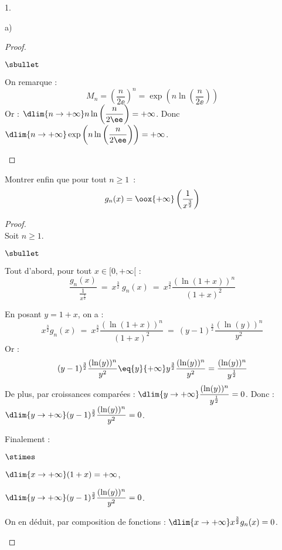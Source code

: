 \documentclass[11pt]{article}%
\begin{document}
\begin{noliste}{1.}
\begin{noliste}{a)}
\begin{proof}
\begin{noliste}{$\sbullet$}
  

  
  \item On remarque :
  \[
   M_n = \left(\dfrac{n}{2\ee}\right)^n =
   \exp \left(n \ln \left(\dfrac{n}{2\ee}\right)\right)
  \]
  Or : $\dlim{n\to+\infty} n \ln\left(\dfrac{n}{2\ee}\right)=+\infty$. 
  Donc $\dlim{n\to + \infty} \exp \left(n \ln 
  \left(\dfrac{n}{2\ee}\right)\right) = +\infty$.
  ~\\[-1.2cm]
 \end{noliste}
\end{proof}




\item Montrer enfin que pour tout $n \geq 1$~:
  \[
  g_n(x)  = \oox{+\infty} \left( 
    \frac{1}{x^{\frac{3}{2}}} \right) 
  \]

  \begin{proof}~\\
    Soit $n\geq 1$.
    \begin{noliste}{$\sbullet$}
    \item Tout d'abord, pour tout $x\in [0,+\infty[$ :
      \[      
      \dfrac{g_n(x)}{\frac{1}{x^{\frac{3}{2}}}} \ = \ x^{\frac{3}{2}}
      \ g_n(x) \ = \ x^{\frac{3}{2}} \dfrac{(\ln(1+x))^n} {(1+x)^2}
      \]

    \item En posant $y = 1+x$, on a :
      \[
      x^{\frac{3}{2}} g_n(x) \ = \ x^{\frac{3}{2}}
      \dfrac{(\ln(1+x))^n} {(1+x)^2} \ = \ (y-1)^{\frac{3}{2}}
      \dfrac{(\ln(y))^n}{y^2}
      \]
      Or :
      \[
      (y-1)^{\frac{3}{2}} \dfrac{(\ln(y))^n}{y^2} \eq{y}{+\infty}
      y^{\frac{3}{2}} \dfrac{(\ln(y))^n}{y^2} =
      \dfrac{(\ln(y))^n}{y^{\frac{1}{2}}}
      \]
      De plus, par croissances comparées : $\dlim{y\to +\infty}
      \dfrac{(\ln(y))^n}{y^{\frac{1}{2}}} = 0$. Donc :
      $\dlim{y\to+\infty} (y-1)^{\frac{3}{2}} \dfrac{(\ln(y))^n}{y^2}
      =0$.

    \item Finalement :
      \begin{noliste}{$\stimes$}
      \item $\dlim{x\to +\infty} (1+x)=+\infty$,
      \item $\dlim{y\to+\infty} (y-1)^{\frac{3}{2}}
        \dfrac{(\ln(y))^n}{y^2} =0$.
      \end{noliste}
      On en déduit, par composition de fonctions : $\dlim{x\to+\infty}
      x^{\frac{3}{2}} g_n(x)=0$.
    \end{noliste}


\end{proof}
\end{noliste}
\end{noliste}
\end{document}
